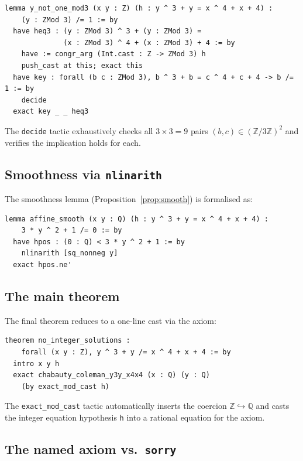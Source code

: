 \documentclass[12pt, a4paper]{article}
\theoremstyle{definition}
\newcommand{\Z}{\mathbb{Z}}
\newcommand{\Q}{\mathbb{Q}}
\begin{document}
\begin{lstlisting}[language=Lean4]
lemma y_not_one_mod3 (x y : Z) (h : y ^ 3 + y = x ^ 4 + x + 4) :
    (y : ZMod 3) /= 1 := by
  have heq3 : (y : ZMod 3) ^ 3 + (y : ZMod 3) =
              (x : ZMod 3) ^ 4 + (x : ZMod 3) + 4 := by
    have := congr_arg (Int.cast : Z -> ZMod 3) h
    push_cast at this; exact this
  have key : forall (b c : ZMod 3), b ^ 3 + b = c ^ 4 + c + 4 -> b /= 1 := by
    decide
  exact key _ _ heq3
\end{lstlisting}

The \texttt{decide} tactic exhaustively checks all $3 \times 3 = 9$ pairs
$(b, c) \in (\Z/3\Z)^2$ and verifies the implication holds for each.

\subsection{Smoothness via \texttt{nlinarith}}

The smoothness lemma (Proposition~\ref{prop:smooth}) is formalised as:

\begin{lstlisting}[language=Lean4]
lemma affine_smooth (x y : Q) (h : y ^ 3 + y = x ^ 4 + x + 4) :
    3 * y ^ 2 + 1 /= 0 := by
  have hpos : (0 : Q) < 3 * y ^ 2 + 1 := by
    nlinarith [sq_nonneg y]
  exact hpos.ne'
\end{lstlisting}

\subsection{The main theorem}

The final theorem reduces to a one-line cast via the axiom:

\begin{lstlisting}[language=Lean4]
theorem no_integer_solutions :
    forall (x y : Z), y ^ 3 + y /= x ^ 4 + x + 4 := by
  intro x y h
  exact chabauty_coleman_y3y_x4x4 (x : Q) (y : Q)
    (by exact_mod_cast h)
\end{lstlisting}

\noindent
The \texttt{exact\_mod\_cast} tactic automatically inserts the coercion
$\Z \hookrightarrow \Q$ and casts the integer equation hypothesis \texttt{h}
into a rational equation for the axiom.

\subsection{The named axiom vs.\ \texttt{sorry}}
\end{document}

